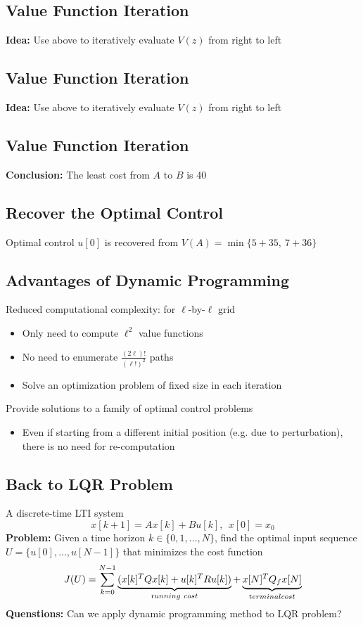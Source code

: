 \documentclass[10pt,a4paper,oneside]{article}
\begin{document}
\subsection{Value Function Iteration}
{\bfseries Idea: }Use above to iteratively evaluate $V(z)$ from right to left
\subsection{Value Function Iteration}
{\bfseries Idea: }Use above to iteratively evaluate $V(z)$ from right to left
\subsection{Value Function Iteration}
{\bfseries Conclusion: }The least cost from $A$ to $B$ is 40
\subsection{Recover the Optimal Control}
Optimal control $u[0]$ is recovered from $V(A) = \min\{5+35,\ 7+36\}$ 
\subsection{Advantages of Dynamic Programming}
Reduced computational complexity: for $\ell$-by-$\ell$ grid
\begin{itemize}
\item Only need to compute $\ell^2$ value functions
\item No need to enumerate $\frac{(2\ell)!}{(\ell!)^2}$ paths
\item Solve an optimization problem of fixed size in each iteration
\end{itemize}
Provide solutions to a family of optimal control problems
\begin{itemize}
\item Even if starting from a different initial position (e.g. due to perturbation), there is no need for re-computation
\end{itemize}
\subsection{Back to LQR Problem}
A discrete-time LTI system
\[
x[k+1]=Ax[k]+Bu[k], \ \ x[0]=x_0
\]
{\bfseries Problem: }Given a time horizon $k\in\{0,1,...,N\}$, find the optimal input sequence $U=\{u[0],...,u[N-1]\}$ that minimizes the cost function
\[
J(U)=\sum_{k=0}^{N-1}\underbrace{(x[k]^TQx[k]+u[k]^TRu[k])}_{\text running \ cost}+\underbrace{x[N]^TQ_fx[N]}_{\text terminal cost}
\]
{\bfseries Quenstions: }Can we apply dynamic programming method to LQR problem?
\end{document}
